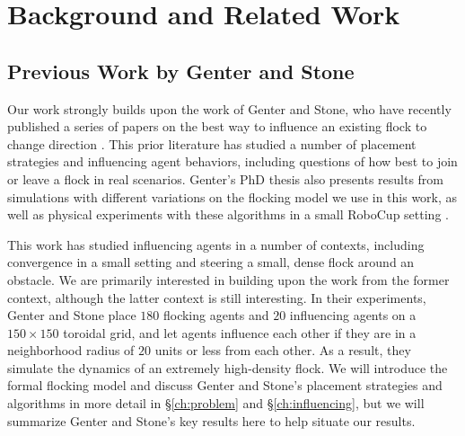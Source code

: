 
\chapter{Background and Related Work}
\label{ch:background}

\section{Previous Work by Genter and Stone}
Our work strongly builds upon the work of Genter and Stone, who have recently
published a series of papers on the best way to influence an existing flock to
change direction \cite{genter2015placement, genter2014neighborsorientherd,
genter2013visionstationary, genter2013backsearch,
genter2016facegoalfacecurrent, genter201612steplookahead}.
This prior literature has studied a number of placement strategies and
influencing agent behaviors, including questions of how best to join or leave
a flock in real scenarios.
Genter's PhD thesis also presents results from simulations with different
variations on the flocking model we use in this work, as well as physical
experiments with these algorithms in a small RoboCup setting
\cite{genterthesis}.

This work has studied influencing agents in a number of contexts, including
convergence in a small setting and steering a small, dense flock around an
obstacle.
We are primarily interested in building upon the work from the former context,
although the latter context is still interesting.
In their experiments, Genter and Stone place $180$ flocking agents and $20$
influencing agents on a $150\times150$ toroidal grid, and let agents influence
each other if they are in a neighborhood radius of $20$ units or less from each
other.
As a result, they simulate the dynamics of an extremely high-density flock.
We will introduce the formal flocking model and discuss Genter and Stone's
placement strategies and algorithms in more detail in \S\ref{ch:problem} and
\S\ref{ch:influencing}, but we will summarize Genter and Stone's key results
here to help situate our results.

